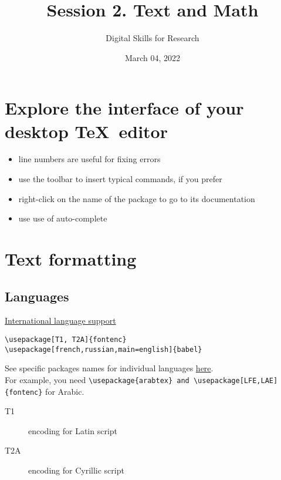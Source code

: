 \documentclass[a4paper,11pt,leqno]{article}
\title{Session 2. Text and Math}
\author{Digital Skills for Research}
\date{March 04, 2022}
\begin{document}
\maketitle
\tableofcontents

\section{Explore the interface of your desktop \TeX~editor}

\begin{itemize}
	\item line numbers are useful for fixing errors
	\item use the toolbar to insert typical commands, if you prefer
	\item right-click on the name of the package to go to its documentation
	\item use use of auto-complete
\end{itemize}

\section{Text formatting}


\subsection{Languages}

 \href{https://www.overleaf.com/learn/latex/International_language_support}{International language support}

\begin{lstlisting}[breaklines]
\usepackage[T1, T2A]{fontenc}
\usepackage[french,russian,main=english]{babel}
\end{lstlisting}

See specific packages names for individual languages \href{https://github.com/kunilovskaya/dskills_workshop/tree/main/alphabets}{here}. \\ For example, you need \verb|\usepackage{arabtex} and \usepackage[LFE,LAE]{fontenc}| for Arabic.

\begin{description}
	\item[T1] encoding for Latin script
	\item[T2A] encoding for Cyrillic script
\end{description}
\end{document}
